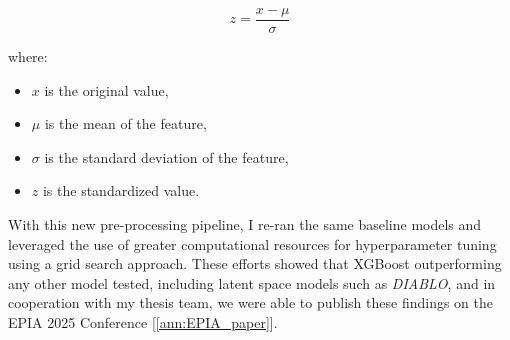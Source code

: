 \[
  z = \frac{x - \mu}{\sigma}
\]

where:
\begin{itemize}
  \item \( x \) is the original value,
  \item \( \mu \) is the mean of the feature,
  \item \( \sigma \) is the standard deviation of the feature,
  \item \( z \) is the standardized value.
\end{itemize}

With this new pre-processing pipeline, I re-ran the same baseline models and
leveraged the use of greater computational resources for hyperparameter tuning
using a grid search approach. These efforts showed that XGBoost outperforming
any other model tested, including latent space models such as \textit{DIABLO},
and in cooperation with my thesis team, we were able to publish these findings
on the EPIA 2025 Conference [\ref{ann:EPIA_paper}].
